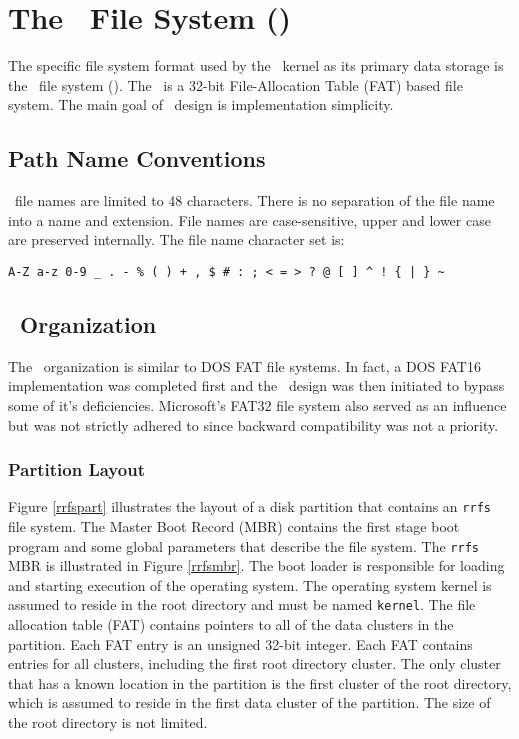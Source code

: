 \section{The \roadrunner\  File System (\rrfs)}

The specific file system format used by the \roadrunner\ 
kernel as its primary data storage is the \roadrunner\ 
file system (\rrfs).  The \rrfs\  is a 32-bit
File-Allocation Table (FAT) based file system.  The main
goal of \rrfs\  design is implementation simplicity.


\subsection{Path Name Conventions}

\rrfs\  file names are limited to 48 characters.  There
is no separation of the file name into a name and extension.
File names are case-sensitive, upper and lower case are
preserved internally.  The file name character set is:

\begin{verbatim}
A-Z a-z 0-9 _ . - % ( ) + , $ # : ; < = > ? @ [ ] ^ ! { | } ~
\end{verbatim}


\subsection{\rrfs\  Organization}

The \rrfs\  organization is similar to DOS FAT file systems.
In fact, a DOS FAT16 implementation was completed first and
the \rrfs\  design was then initiated to bypass some of it's
deficiencies.  Microsoft's FAT32 file system also served as
an influence but was not strictly adhered to since backward
compatibility was not a priority.


\subsubsection{Partition Layout}

Figure \ref{rrfspart} illustrates the layout of a disk
partition that contains an {\tt rrfs} file system.  The
Master Boot Record (MBR) contains the first stage boot
program and some global parameters that describe the file
system.  The {\tt rrfs} MBR is illustrated in Figure
\ref{rrfsmbr}.  The boot loader is responsible for loading
and starting execution of the operating system.  The
operating system kernel is assumed to reside in the root
directory and must be named {\tt kernel}.  The file
allocation table (FAT) contains pointers to all of the
data clusters in the partition.  Each FAT entry is an
unsigned 32-bit integer.  Each FAT contains entries for
all clusters, including the first root directory cluster.
The only cluster that has a known location in the partition
is the first cluster of the root directory, which is assumed
to reside in the first data cluster of the partition.  The
size of the root directory is not limited.

